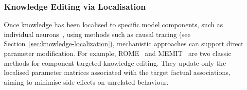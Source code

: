 \subsubsection{Knowledge Editing via Localisation}
\label{subsec:knowedit}

Once knowledge has been localised to specific model components, such as individual neurons~, using methods such as causal tracing (see Section~\ref{sec:knowledge-localization}), mechanistic approaches can support direct parameter modification. For example, ROME~ and MEMIT~ are two classic methods for component-targeted knowledge editing. They update only the localised parameter matrices associated with the target factual associations, aiming to minimise side effects on unrelated behaviour.







